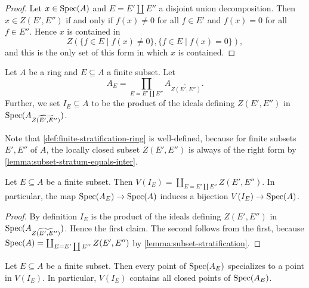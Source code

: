\begin{proof}
    Let $x \in \mathrm{Spec}(A)$ and $E = E' \coprod E''$ a disjoint union decomposition. Then
    $x \in Z(E', E'')$ if and only if $f(x) \neq 0$ for all $f \in E'$ and $f(x) = 0$
    for all $f \in E''$. Hence $x$ is contained in
    \[
    Z(\{ f \in E  \mid f(x) \neq 0\}, \{f \in E  \mid f(x) = 0\})
    ,\] and this is the only set of this form in which $x$ is contained.
\end{proof}

\begin{definition}
    Let $A$ be a ring and $E \subseteq A$ a finite subset. Let
    \[
    A_{E} = \prod_{E = E' \coprod E''} A_{\widetilde{Z(E', E'')}}
    .\]
    Further, we set $I_E \subseteq A$ to be the product of the ideals
    defining $Z(E', E'')$ in $\mathrm{Spec}(A_{\widetilde{Z(E', E'')}})$.
    \label{def:finite-stratification-ring}
\end{definition}

Note that \ref{def:finite-stratification-ring} is well-defined, because for finite
subsets $E', E''$ of $A$, the locally closed subset $Z(E', E'')$ is always
of the right form by \ref{lemma:subset-stratum-equals-inter}.

\begin{lemma}
    Let $E \subseteq A$ be a finite subset. Then
    $V(I_E) = \coprod_{E = E' \coprod E''} Z(E', E'')$. In particular,
    the map $\mathrm{Spec}(A_E) \to \mathrm{Spec}(A)$ induces a bijection $V(I_E) \to \mathrm{Spec}(A)$.
    \label{lemma:finite-stratification-ideal-bijection}
\end{lemma}

\begin{proof}
    By definition $I_E$ is the product of the ideals defining $Z(E', E'')$ in
    $\mathrm{Spec}(A_{\widetilde{Z(E', E'')}})$. Hence the first claim. The second
    follows from the first, because $\mathrm{Spec}(A) = \coprod_{E = E' \coprod E''} Z(E', E'')$ by
    \ref{lemma:subset-stratification}.
\end{proof}

\begin{lemma}
    Let $E \subseteq A$ be a finite subset. Then every point of $\mathrm{Spec}(A_E)$ specializes
    to a point in $V(I_E)$. In particular, $V(I_E)$ contains all closed points of $\mathrm{Spec}(A_E)$.%
    \label{lemma:finite-stratification-closed-points}
\end{lemma}


